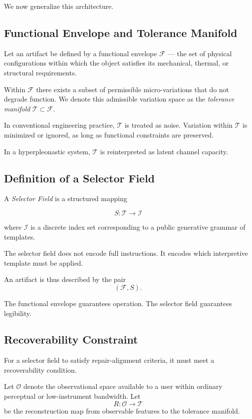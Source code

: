 \documentclass[11pt]{article}
\begin{document}
We now generalize this architecture.

\subsection{Functional Envelope and Tolerance Manifold}

Let an artifact be defined by a functional envelope $\mathcal{F}$ --- 
the set of physical configurations within which the object satisfies 
its mechanical, thermal, or structural requirements.

Within $\mathcal{F}$ there exists a subset of permissible micro-variations 
that do not degrade function. We denote this admissible variation space 
as the \emph{tolerance manifold} $\mathcal{T} \subset \mathcal{F}$.

In conventional engineering practice, $\mathcal{T}$ is treated as noise. 
Variation within $\mathcal{T}$ is minimized or ignored, as long as 
functional constraints are preserved.

In a hyperpleonastic system, $\mathcal{T}$ is reinterpreted as latent 
channel capacity.

\subsection{Definition of a Selector Field}

A \emph{Selector Field} is a structured mapping

\[
S : \mathcal{T} \rightarrow \mathcal{I}
\]

where $\mathcal{I}$ is a discrete index set corresponding to a public 
generative grammar of templates.

The selector field does not encode full instructions. It encodes 
which interpretive template must be applied.

An artifact is thus described by the pair
\[
(\mathcal{F}, S).
\]

The functional envelope guarantees operation. 
The selector field guarantees legibility.

\subsection{Recoverability Constraint}

For a selector field to satisfy repair-alignment criteria, it must meet 
a recoverability condition.

Let $\mathcal{O}$ denote the observational space available to a user 
within ordinary perceptual or low-instrument bandwidth. Let 
\[
R : \mathcal{O} \rightarrow \mathcal{T}
\]
be the reconstruction map from observable features to the tolerance 
manifold.
\end{document}
